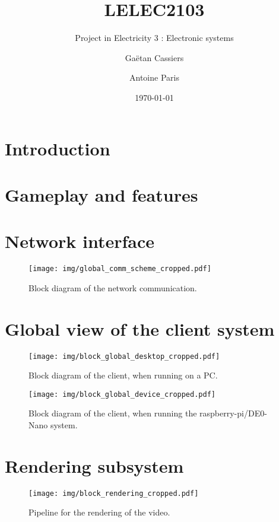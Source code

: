 \documentclass[english, DIV=13]{scrreprt}
\title{LELEC2103}
\subtitle{Project in Electricity 3 : Electronic systems}
\author{Gaëtan Cassiers\and Antoine Paris}
\date{\today}
\begin{document}
\maketitle

\chapter{Introduction}

\chapter{Gameplay and features}

\chapter{Network interface}

\begin{figure}
    \centering
    \texttt{[image: img/global\_comm\_scheme\_cropped.pdf]}
    \caption{Block diagram of the network communication.}
\end{figure}

\chapter{Global view of the client system}

\begin{figure}
    \centering
    \texttt{[image: img/block\_global\_desktop\_cropped.pdf]}
    \caption{Block diagram of the client, when running on a PC.}
\end{figure}

\begin{figure}
    \centering
    \texttt{[image: img/block\_global\_device\_cropped.pdf]}
    \caption{Block diagram of the client, when running the raspberry-pi/DE0-Nano system.}
\end{figure}

\chapter{Rendering subsystem}

\begin{figure}
    \centering
    \texttt{[image: img/block\_rendering\_cropped.pdf]}
    \caption{Pipeline for the rendering of the video.}
\end{figure}
\end{document}
